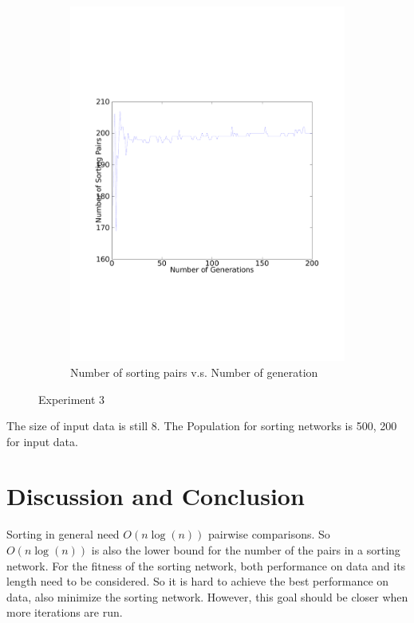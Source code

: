 \documentclass[11pt]{article}
\begin{document}
\begin{figure}[h!]
\begin{subfigure}[b]{0.49\textwidth}
	\includegraphics[width=\textwidth]{4_2.pdf}
	\caption{Number of sorting pairs v.s. Number of generation}
\end{subfigure}
\caption{Experiment 3}
\label{fig:lin_opt}
\end{figure}

The size of input data is still 8. The Population for sorting networks
is 500, 200 for input data.

\section{Discussion and Conclusion}

Sorting in general need $O(n\log(n))$ pairwise comparisons. So
$O(n\log(n))$ is also the lower bound for the number of the pairs in
a sorting network. For the fitness of the sorting network, both
performance on data and its length need to be considered. So it is
hard to achieve the best performance on data, also minimize the
sorting network. However, this goal should be closer when more
iterations are run.
\end{document}
